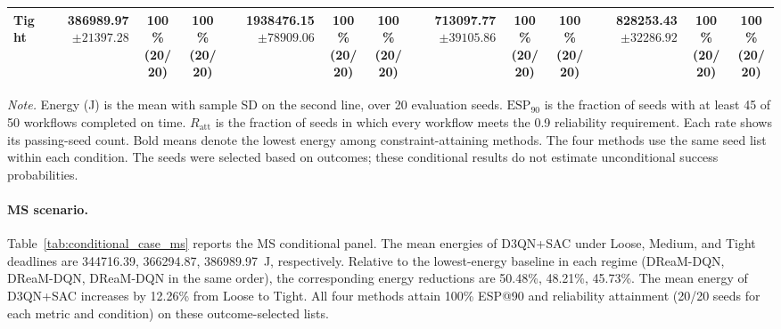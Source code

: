 \documentclass[10pt]{article}
\begin{document}
\begin{table}[!htbp]
\begin{tabular}{@{}l*{4}{rcc}@{}}
Tight & \shortstack[r]{\textbf{386989.97}\\$\pm 21397.28$} & \shortstack[c]{100\%\\(20/20)} & \shortstack[c]{100\%\\(20/20)} & \shortstack[r]{1938476.15\\$\pm 78909.06$} & \shortstack[c]{100\%\\(20/20)} & \shortstack[c]{100\%\\(20/20)} & \shortstack[r]{713097.77\\$\pm 39105.86$} & \shortstack[c]{100\%\\(20/20)} & \shortstack[c]{100\%\\(20/20)} & \shortstack[r]{828253.43\\$\pm 32286.92$} & \shortstack[c]{100\%\\(20/20)} & \shortstack[c]{100\%\\(20/20)} \\
\bottomrule
\end{tabular}
\par\vspace{3pt}
\parbox{\textwidth}{\footnotesize
\textit{Note.} Energy (J) is the mean with sample SD on the second line, over 20 evaluation seeds.
$\mathrm{ESP}_{90}$ is the fraction of seeds with at least 45 of 50 workflows completed on time.
$R_{\mathrm{att}}$ is the fraction of seeds in which every workflow meets the 0.9 reliability requirement.
Each rate shows its passing-seed count. Bold means denote the lowest energy among constraint-attaining methods.
The four methods use the same seed list within each condition.
The seeds were selected based on outcomes; these conditional results do not estimate unconditional success probabilities.}
\endgroup
\end{table}

\paragraph{MS scenario.}
Table~\ref{tab:conditional_case_ms} reports the MS conditional panel. The mean energies of D3QN+SAC under Loose, Medium, and Tight deadlines are 344716.39, 366294.87, 386989.97~J, respectively. Relative to the lowest-energy baseline in each regime (DReaM-DQN, DReaM-DQN, DReaM-DQN in the same order), the corresponding energy reductions are 50.48\%, 48.21\%, 45.73\%. The mean energy of D3QN+SAC increases by 12.26\% from Loose to Tight. All four methods attain 100\% ESP@90 and reliability attainment (20/20 seeds for each metric and condition) on these outcome-selected lists.
\clearpage
\end{document}
